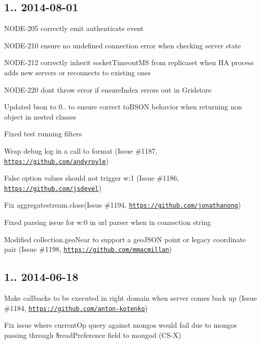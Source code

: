 \subsection*{1.. 2014-\/08-\/01 }


\begin{DoxyItemize}
\item N\+O\+D\+E-\/205 correctly emit authenticate event
\item N\+O\+D\+E-\/210 ensure no undefined connection error when checking server state
\item N\+O\+D\+E-\/212 correctly inherit socket\+Timeout\+MS from replicaset when HA process adds new servers or reconnects to existing ones
\item N\+O\+D\+E-\/220 don\textquotesingle{}t throw error if ensure\+Index errors out in Gridstore
\item Updated bson to 0.. to ensure correct to\+B\+S\+ON behavior when returning non object in nested classes
\item Fixed test running filters
\item Wrap debug log in a call to format (Issue \#1187, \href{https://github.com/andyroyle}{\tt https\+://github.\+com/andyroyle})
\item False option values should not trigger w\+:1 (Issue \#1186, \href{https://github.com/jsdevel}{\tt https\+://github.\+com/jsdevel})
\item Fix aggregatestream.\+close(Issue \#1194, \href{https://github.com/jonathanong}{\tt https\+://github.\+com/jonathanong})
\item Fixed parsing issue for w\+:0 in url parser when in connection string
\item Modified collection.\+geo\+Near to support a geo\+J\+S\+ON point or legacy coordinate pair (Issue \#1198, \href{https://github.com/mmacmillan}{\tt https\+://github.\+com/mmacmillan})
\end{DoxyItemize}

\subsection*{1.. 2014-\/06-\/18 }


\begin{DoxyItemize}
\item Make callbacks to be executed in right domain when server comes back up (Issue \#1184, \href{https://github.com/anton-kotenko}{\tt https\+://github.\+com/anton-\/kotenko})
\item Fix issue where current\+Op query against mongos would fail due to mongos passing through \$read\+Preference field to mongod (C\+S-\/X)
\end{DoxyItemize}

